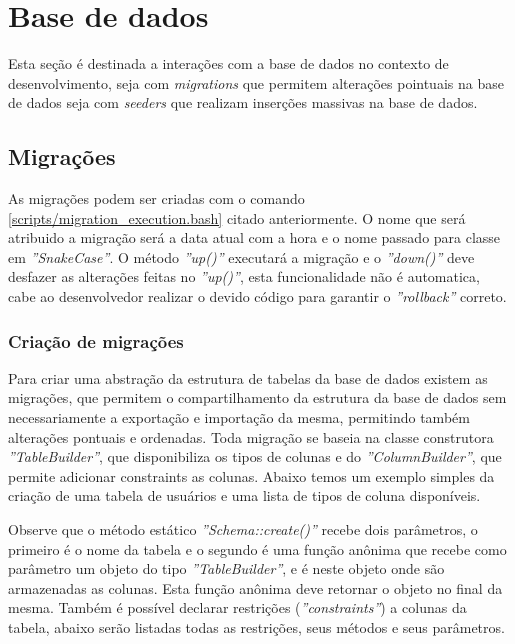 \spaceH{}

\label{scripts/trace_relation.php}

\section{Base de dados}

Esta seção é destinada a interações com a base de dados no contexto de desenvolvimento, seja com \textit{migrations} que permitem alterações pointuais na base de dados seja com \textit{seeders} que realizam inserções massivas na base de dados.

\subsection{Migrações}


As migrações podem ser criadas com o comando \ref{scripts/migration_execution.bash} citado anteriormente. O nome que será atribuido a migração será a data atual com a hora e o nome passado para classe em \textit{''SnakeCase''}. O método \textit{''up()''} executará a migração e o \textit{''down()''} deve desfazer as alterações feitas no \textit{''up()''}, esta funcionalidade não é automatica, cabe ao desenvolvedor realizar o devido código para garantir o \textit{''rollback''} correto.

\subsubsection{Criação de migrações}
Para criar uma abstração da estrutura de tabelas da base de dados existem as migrações, que permitem o compartilhamento da estrutura da base de dados sem necessariamente a exportação e importação da mesma, permitindo também alterações pontuais e ordenadas. Toda migração se baseia na classe construtora \textit{''TableBuilder''}, que disponibiliza os tipos de colunas e do \textit{''ColumnBuilder''}, que permite adicionar constraints as colunas. Abaixo temos um exemplo simples da criação de uma tabela de usuários e uma lista de tipos de coluna disponíveis.

\spaceH{}

\label{scripts/migration_class_example.php}

Observe que o método estático \textit{''Schema::create()''} recebe dois parâmetros, o primeiro é o nome da tabela e o segundo é uma função anônima que recebe como parâmetro um objeto do tipo \textit{''TableBuilder''}, e é neste objeto onde são armazenadas as colunas. Esta função anônima deve retornar o objeto no final da mesma. Também é possível declarar restrições (\textit{''constraints''}) a colunas da tabela, abaixo serão listadas todas as restrições, seus métodos e seus parâmetros.

